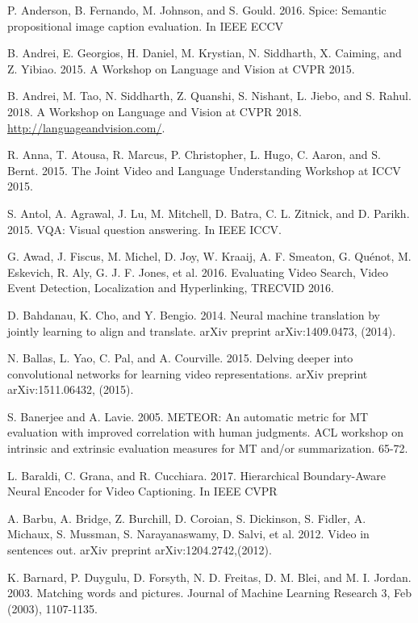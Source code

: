 \documentclass[10pt,journal,compsoc]{IEEEtran}
\begin{document}
\begin{thebibliography}{1}
P. Anderson, B. Fernando, M. Johnson, and S. Gould. 2016. Spice: Semantic propositional image caption evaluation. In IEEE ECCV

B. Andrei, E. Georgios, H. Daniel, M. Krystian, N. Siddharth, X. Caiming, and Z. Yibiao. 2015. A Workshop on Language and Vision at CVPR 2015.

B. Andrei, M. Tao, N. Siddharth, Z. Quanshi, S. Nishant, L. Jiebo, and S. Rahul. 2018. A Workshop on Language and Vision at CVPR 2018. \url{http://languageandvision.com/}.

R. Anna, T. Atousa, R. Marcus, P. Christopher, L. Hugo, C. Aaron, and S. Bernt. 2015. The Joint Video and Language Understanding Workshop at ICCV 2015.

S. Antol, A. Agrawal, J. Lu, M. Mitchell, D. Batra, C. L. Zitnick, and D. Parikh. 2015. VQA: Visual question answering. In IEEE ICCV.

G. Awad, J. Fiscus, M. Michel, D. Joy, W. Kraaij, A. F. Smeaton, G. Quénot, M. Eskevich, R. Aly, G. J. F. Jones, et al. 2016. Evaluating Video Search, Video Event Detection, Localization and Hyperlinking, TRECVID 2016.

D. Bahdanau, K. Cho, and Y. Bengio. 2014. Neural machine translation by jointly learning to align and translate. arXiv preprint arXiv:1409.0473, (2014).

N. Ballas, L. Yao, C. Pal, and A. Courville. 2015. Delving deeper into convolutional networks for learning video representations. arXiv preprint arXiv:1511.06432, (2015).

S. Banerjee and A. Lavie. 2005. METEOR: An automatic metric for MT evaluation with improved correlation with human judgments. ACL workshop on intrinsic and extrinsic evaluation measures for MT and/or summarization. 65-72.

L. Baraldi, C. Grana, and R. Cucchiara. 2017. Hierarchical Boundary-Aware Neural Encoder for Video Captioning. In IEEE CVPR

A. Barbu, A. Bridge, Z. Burchill, D. Coroian, S. Dickinson, S. Fidler, A. Michaux, S. Mussman, S. Narayanaswamy, D. Salvi, et al. 2012. Video in sentences out. arXiv preprint arXiv:1204.2742,(2012).

K. Barnard, P. Duygulu, D. Forsyth, N. D. Freitas, D. M. Blei, and M. I. Jordan. 2003. Matching words and pictures. Journal of Machine Learning Research 3, Feb (2003), 1107-1135.


\end{thebibliography}
\end{document}
